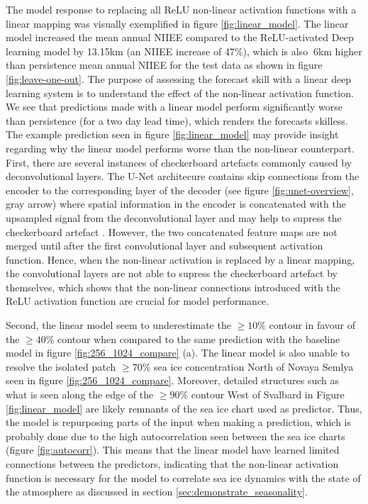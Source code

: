 \documentclass[../main/thesis]{subfiles}
\begin{document}
The model response to replacing all ReLU non-linear activation functions \citep{Nair2010} with a linear mapping was visually exemplified in figure \ref{fig:linear_model}. The linear model increased the mean annual NIIEE compared to the ReLU-activated Deep learning model by 13.15km (an NIIEE increase of 47\%), which is also $~ 6$km higher than persistence mean annual NIIEE for the test data as shown in figure \ref{fig:leave-one-out}. The purpose of assessing the forecast skill with a linear deep learning system is to understand the effect of the non-linear activation function. We see that predictions made with a linear model perform significantly worse than persistence (for a two day lead time), which renders the forecasts skilless. The example prediction seen in figure \ref{fig:linear_model} may provide insight regarding why the linear model performs worse than the non-linear counterpart. First, there are several instances of checkerboard artefacts commonly caused by deconvolutional layers. The U-Net architecure contains skip connections from the encoder to the corresponding layer of the decoder (see figure \ref{fig:unet-overview}, gray arrow) where spatial information in the encoder is concatenated with the upsampled signal from the deconvolutional layer and may help to supress the checkerboard artefact \citep{Ronneberger2015}. However, the two concatenated feature maps are not merged until after the first convolutional layer and subsequent activation function. Hence, when the non-linear activation is replaced by a linear mapping, the convolutional layers are not able to supress the checkerboard artefact by themselves, which shows that the non-linear connections introduced with the ReLU activation function are crucial for model performance.

Second, the linear model seem to underestimate the $\geq 10\%$ contour in favour of the $\geq 40\%$ contour when compared to the same prediction with the baseline model in figure \ref{fig:256_1024_compare} (a). The linear model is also unable to resolve the isolated patch $\geq 70\%$ sea ice concentration North of Novaya Semlya seen in figure \ref{fig:256_1024_compare}. Moreover, detailed structures such as what is seen along the edge of the $\geq 90\%$ contour West of Svalbard in Figure \ref{fig:linear_model} are likely remnants of the sea ice chart used as predictor. Thus, the model is repurposing parts of the input when making a prediction, which is probably done due to the high autocorrelation seen between the sea ice charts (figure \ref{fig:autocorr}). This means that the linear model have learned limited connections between the predictors, indicating that the non-linear activation function is necessary for the model to correlate sea ice dynamics with the state of the atmosphere as discussed in section \ref{sec:demonstrate_seasonality}.
\end{document}
